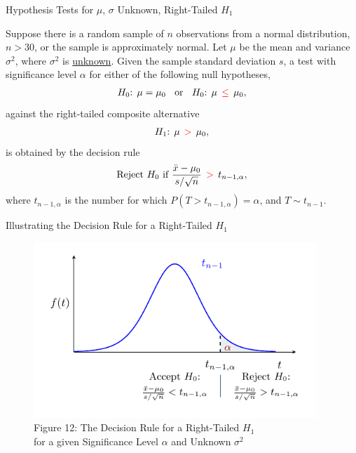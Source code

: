 \documentclass[pdf]{beamer}
\theoremstyle{remark}
\theoremstyle{definition}
\begin{document}
\begin{frame}[t]{Hypothesis Tests for $\mu$, $\sigma$ Unknown, Right-Tailed $H_1$}
\small
\begin{tcolorbox}[colback=white!5,colframe=franklinblue]%
Suppose there is a random sample of $n$ observations from a normal distribution, $n > 30$, or the sample is approximately normal.  Let $\mu$ be the mean and variance $\sigma^2$, where $\sigma^2$ is \underline{unknown}.  Given the sample standard deviation $s$, a test with significance level $\alpha$ for either of the following null hypotheses, 
\vspace{-1.0ex}
\begin{align*} 
H_0\text{: }  \mu = \mu_0 \;\; \text{ or } \;\; H_0\text{: }  \mu \;\, \textcolor{red}{\leq} \;\, \mu_0, 
\end{align*} 
\vspace{-1.0ex}
against the right-tailed composite alternative 
\vspace{0.0ex}
\begin{align*} 
H_1\text{: }  \mu \;\, \textcolor{red}{>} \;\, \mu_0, 
\end{align*} 
\vspace{-1.0ex}
is obtained by the decision rule 
\vspace{0.0ex}
\begin{equation} 
\text{Reject } H_0 \text{ if } \frac{\bar{x} - \mu_0}{s/ \sqrt{n}} \;\, \textcolor{red}{>} \;\, t_{n-1,\alpha},
\end{equation} 
where $t_{n-1,\alpha}$ is the number for which $P(T > t_{n-1,\alpha}) = \alpha$, and $T \sim t_{n-1}$. 
\end{tcolorbox}
\end{frame}

\begin{frame}[t]{Illustrating the Decision Rule for a Right-Tailed $H_1$ }
\begin{figure}[htbp]
    \centering
    \captionsetup{justification=centering}
    \includegraphics[clip, trim=0.5cm 0.5cm 0.0cm 0cm, width=0.95\textwidth]{Hypothesis_Testing_Module_9_t1.pdf}  
    \caption{Figure {\color{franklinblue} 12}: The Decision Rule for a Right-Tailed $H_1$ \\ for a given Significance Level $\alpha$ and Unknown $\sigma^2$}
    \label{fig:gauss4}
\end{figure}
\end{frame}
\end{document}
